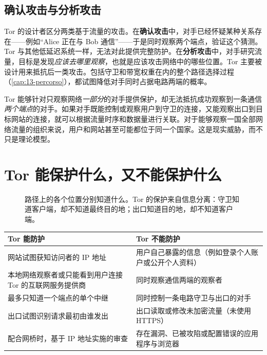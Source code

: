 \subsection{确认攻击与分析攻击}

Tor 的设计者区分两类基于流量的攻击。在\textbf{确认攻击}中，对手已经怀疑某种关系存在——例如\enquote{Alice 正在与 Bob 通信}——于是同时观察两个端点，验证这个猜测。Tor 与其他低延迟系统一样，无法对此提供完整防护。在\textbf{分析攻击}中，对手研究流量，目标是发现\emph{应该去哪里观察}，也就是应该攻击网络中的哪些位置。Tor 主要被设计用来抵抗后一类攻击。包括守卫和带宽权重在内的整个路径选择过程（\cref{cap:13-percorso}），都试图降低对手同时占据电路两端的概率。

\begin{attenzione}[必须牢记的原则]
Tor 能够针对只观察网络\emph{一部分}的对手提供保护，却无法抵抗成功观察到一条通信\emph{两个端点}的对手。如果对手既能控制或观察用户到守卫的连接，又能观察出口到目标网站的连接，就可以根据流量时序和数据量进行关联。对于能够观察一国全部网络流量的组织来说，用户和网站甚至可能都位于同一个国家。这是现实威胁，而不只是理论模型。
\end{attenzione}

\section{Tor 能保护什么，又不能保护什么}\label{sec:minaccia-sintesi}

\begin{figure}[htbp]
\centering

\caption{路径上的各个位置分别知道什么。Tor 的保护来自信息分离：守卫知道客户端，却不知道最终目的地；出口知道目的地，却不知道客户端。}
\label{fig:sapere}
\end{figure}

\begin{center}\small
\begin{tabularx}{\textwidth}{@{}>{\raggedright\arraybackslash}X>{\raggedright\arraybackslash}X@{}}
\toprule
Tor 能防护 & Tor 不能防护 \\
\midrule
网站试图获知访问者的 IP 地址 & 用户自己暴露的信息（例如登录个人账户或公开个人资料） \\
本地网络观察者或只能看到用户连接 Tor 的互联网服务提供商 & 同时观察通信两端的观察者 \\
最多只知道一个端点的单个中继 & 同时控制一条电路守卫与出口的对手 \\
出口试图识别请求最初由谁发出 & 出口读取或修改未加密流量（未使用 HTTPS） \\
配合网桥时，基于 IP 地址实施的审查 & 存在漏洞、已被攻陷或配置错误的应用程序与浏览器 \\
\bottomrule
\end{tabularx}
\end{center}


